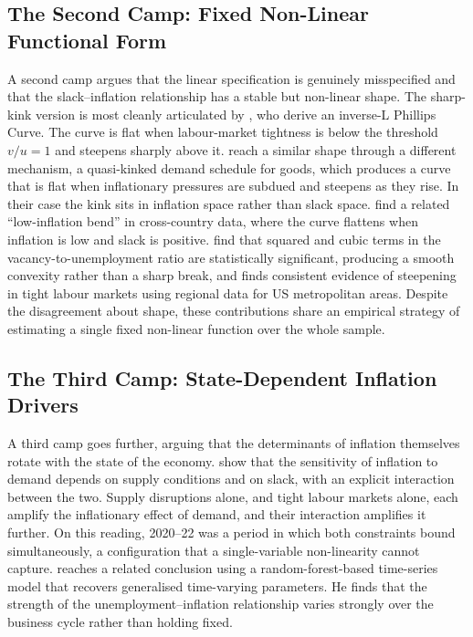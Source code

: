 \documentclass[12pt,a4paper]{article}
\begin{document}
\subsection{The Second Camp: Fixed Non-Linear Functional Form}
\label{subsec:camp2}

A second camp argues that the linear specification is genuinely misspecified and that the slack--inflation relationship has a stable but non-linear shape. The sharp-kink version is most cleanly articulated by \citet{benigno2023}, who derive an inverse-L Phillips Curve. The curve is flat when labour-market tightness is below the threshold $v/u = 1$ and steepens sharply above it. \citet{harding2023} reach a similar shape through a different mechanism, a quasi-kinked demand schedule for goods, which produces a curve that is flat when inflationary pressures are subdued and steepens as they rise. In their case the kink sits in inflation space rather than slack space. \citet{forbes2022} find a related ``low-inflation bend'' in cross-country data, where the curve flattens when inflation is low and slack is positive. \citet{ball2022} find that squared and cubic terms in the vacancy-to-unemployment ratio are statistically significant, producing a smooth convexity rather than a sharp break, and \citet{gitti2024} finds consistent evidence of steepening in tight labour markets using regional data for US metropolitan areas. Despite the disagreement about shape, these contributions share an empirical strategy of estimating a single fixed non-linear function over the whole sample.

\subsection{The Third Camp: State-Dependent Inflation Drivers}
\label{subsec:camp3}

A third camp goes further, arguing that the determinants of inflation themselves rotate with the state of the economy. \citet{cbo2023} show that the sensitivity of inflation to demand depends on supply conditions and on slack, with an explicit interaction between the two. Supply disruptions alone, and tight labour markets alone, each amplify the inflationary effect of demand, and their interaction amplifies it further. On this reading, 2020--22 was a period in which both constraints bound simultaneously, a configuration that a single-variable non-linearity cannot capture. \citet{coulombe2024} reaches a related conclusion using a random-forest-based time-series model that recovers generalised time-varying parameters. He finds that the strength of the unemployment--inflation relationship varies strongly over the business cycle rather than holding fixed.
\end{document}
